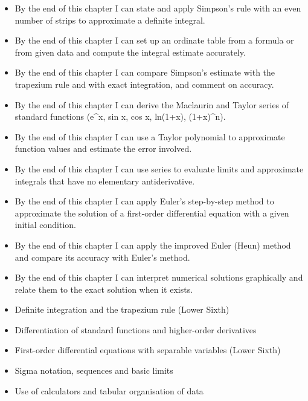 \documentclass[11pt]{article}
\begin{document}
\begin{objectifs}
\begin{itemize}
\item By the end of this chapter I can state and apply Simpson's rule with an even number of strips to approximate a definite integral.
\item By the end of this chapter I can set up an ordinate table from a formula or from given data and compute the integral estimate accurately.
\item By the end of this chapter I can compare Simpson's estimate with the trapezium rule and with exact integration, and comment on accuracy.
\item By the end of this chapter I can derive the Maclaurin and Taylor series of standard functions (e\^{}x, sin x, cos x, ln(1+x), (1+x)\^{}n).
\item By the end of this chapter I can use a Taylor polynomial to approximate function values and estimate the error involved.
\item By the end of this chapter I can use series to evaluate limits and approximate integrals that have no elementary antiderivative.
\item By the end of this chapter I can apply Euler's step-by-step method to approximate the solution of a first-order differential equation with a given initial condition.
\item By the end of this chapter I can apply the improved Euler (Heun) method and compare its accuracy with Euler's method.
\item By the end of this chapter I can interpret numerical solutions graphically and relate them to the exact solution when it exists.
\end{itemize}
\end{objectifs}

\begin{prerequis}
\begin{itemize}
\item Definite integration and the trapezium rule (Lower Sixth)
\item Differentiation of standard functions and higher-order derivatives
\item First-order differential equations with separable variables (Lower Sixth)
\item Sigma notation, sequences and basic limits
\item Use of calculators and tabular organisation of data
\end{itemize}
\end{prerequis}
\end{document}
